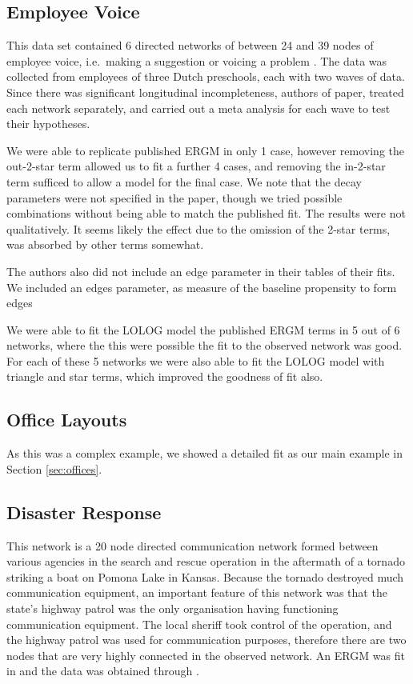 \documentclass[
]{statsoc}
\begin{document}
\subsection{Employee Voice}

This data set contained 6 directed networks of between 24 and 39 nodes
of employee voice, i.e.~making a suggestion or voicing a problem
\cite{Pauksktat2011}. The data was collected from employees of three
Dutch preschools, each with two waves of data. Since there was
significant longitudinal incompleteness, authors of paper, treated each
network separately, and carried out a meta analysis for each wave to
test their hypotheses.

We were able to replicate published ERGM in only 1 case, however
removing the out-2-star term allowed us to fit a further 4 cases, and
removing the in-2-star term sufficed to allow a model for the final
case. We note that the decay parameters were not specified in the paper,
though we tried possible combinations without being able to match the
published fit. The results were not qualitatively. It seems likely the
effect due to the omission of the 2-star terms, was absorbed by other
terms somewhat.

The authors also did not include an edge parameter in their tables of
their fits. We included an edges parameter, as measure of the baseline
propensity to form edges

We were able to fit the LOLOG model the published ERGM terms in 5 out of
6 networks, where the this were possible the fit to the observed network
was good. For each of these 5 networks we were also able to fit the
LOLOG model with triangle and star terms, which improved the goodness of
fit also.

\subsection{Office Layouts}

As this was a complex example, we showed a detailed fit as our main
example in Section \ref{sec:offices}.

\subsection{Disaster Response}

This network is a 20 node directed communication network formed between
various agencies in the search and rescue operation in the aftermath of
a tornado striking a boat on Pomona Lake in Kansas. Because the tornado
destroyed much communication equipment, an important feature of this
network was that the state's highway patrol was the only organisation
having functioning communication equipment. The local sheriff took
control of the operation, and the highway patrol was used for
communication purposes, therefore there are two nodes that are very
highly connected in the observed network. An ERGM was fit in
\cite{Doreian2012} and the data was obtained through
\cite{DisasterData}.
\end{document}
